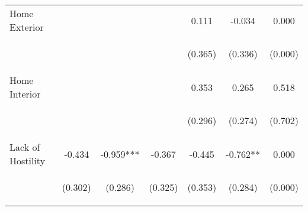 \begin{tabular}{lcccccc}
\noalign{\smallskip}Home Exterior &  &  &  & 0.111 & -0.034 & 0.000\\
 & \begin{footnotesize}\end{footnotesize} & \begin{footnotesize}\end{footnotesize} & \begin{footnotesize}\end{footnotesize} & \begin{footnotesize}(0.365)\end{footnotesize} & \begin{footnotesize}(0.336)\end{footnotesize} & \begin{footnotesize}(0.000)\end{footnotesize}\\
\noalign{\smallskip}Home Interior &  &  &  & 0.353 & 0.265 & 0.518\\
 & \begin{footnotesize}\end{footnotesize} & \begin{footnotesize}\end{footnotesize} & \begin{footnotesize}\end{footnotesize} & \begin{footnotesize}(0.296)\end{footnotesize} & \begin{footnotesize}(0.274)\end{footnotesize} & \begin{footnotesize}(0.702)\end{footnotesize}\\
\noalign{\smallskip}Lack of Hostility & -0.434 & -0.959*** & -0.367 & -0.445 & -0.762** & 0.000\\
 & \begin{footnotesize}(0.302)\end{footnotesize} & \begin{footnotesize}(0.286)\end{footnotesize} & \begin{footnotesize}(0.325)\end{footnotesize} & \begin{footnotesize}(0.353)\end{footnotesize} & \begin{footnotesize}(0.284)\end{footnotesize} & \begin{footnotesize}(0.000)\end{footnotesize}\\

\end{tabular}
